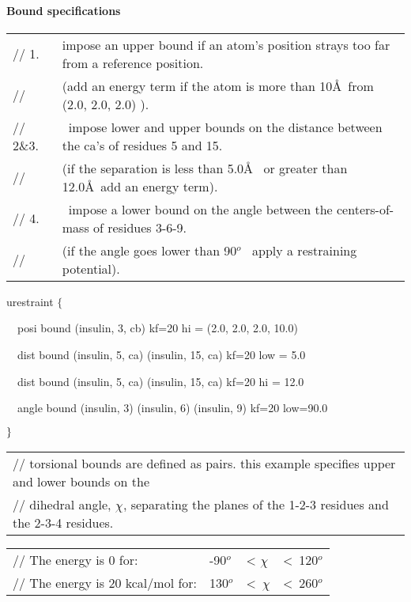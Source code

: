 \paragraph*{Bound specifications}

\begin{tabular}{ll}
{\footnotesize // 1. } & {\footnotesize impose an upper bound if an atom's
position strays too far from a reference position.} \\ 
{\footnotesize // } & {\footnotesize (add an energy term if the atom is more
than 10\AA\ {}from (2.0, 2.0, 2.0) ).} \\ 
{\footnotesize // 2\&3.} & {\footnotesize \ impose lower and upper bounds on
the distance between the ca's of residues 5 and 15.} \\ 
{\footnotesize //} & {\footnotesize (if the separation is less than 5.0\AA\ %
{}or greater than 12.0\AA\ {}add an energy term).} \\ 
{\footnotesize // 4.} & {\footnotesize \ impose a lower bound on the angle
between the centers-of-mass of residues 3-6-9.} \\ 
{\footnotesize //} & {\footnotesize (if the angle goes lower than 90}$^{o}$%
{\footnotesize \ apply a restraining potential).}
\end{tabular}

urestraint $\{$

~~posi bound (insulin, 3, cb) kf=20 hi = (2.0, 2.0, 2.0, 10.0)

~~dist bound (insulin, 5, ca) (insulin, 15, ca) kf=20 low = 5.0

~~dist bound (insulin, 5, ca) (insulin, 15, ca) kf=20 hi = 12.0

~~angle bound (insulin, 3) (insulin, 6) (insulin, 9) kf=20 low=90.0

$\}\bigskip $

\begin{tabular}{l}
{\footnotesize // torsional bounds are defined as pairs. this example
specifies upper and lower bounds on the} \\ 
{\footnotesize // dihedral angle, }$\chi ${\footnotesize {}, separating the
planes of the 1-2-3 residues and the 2-3-4 residues.}
\end{tabular}

\begin{tabular}{llll}
{\footnotesize // The energy is 0 for:} & {\footnotesize -90}$^{o}$ & 
{\footnotesize < }$\chi $ & {\footnotesize <\ 120}$%
^{o}$ \\ 
{\footnotesize // The energy is 20 kcal/mol for:} & {\footnotesize 130}$^{o}$
& {\footnotesize <\ }$\chi $ & {\footnotesize <\
260}$^{o}$%
\end{tabular}

